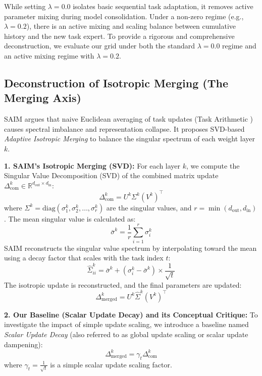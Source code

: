 While setting $\lambda = 0.0$ isolates basic sequential task adaptation, it removes active parameter mixing during model consolidation. Under a non-zero regime (e.g., $\lambda = 0.2$), there is an active mixing and scaling balance between cumulative history and the new task expert. To provide a rigorous and comprehensive deconstruction, we evaluate our grid under both the standard $\lambda = 0.0$ regime and an active mixing regime with $\lambda = 0.2$.

\subsection{Deconstruction of Isotropic Merging (The Merging Axis)}
SAIM argues that naive Euclidean averaging of task updates (Task Arithmetic \cite{taskarithmetic}) causes spectral imbalance and representation collapse. It proposes SVD-based \emph{Adaptive Isotropic Merging} to balance the singular spectrum of each weight layer $k$.

\textbf{1. SAIM's Isotropic Merging (SVD):} For each layer $k$, we compute the Singular Value Decomposition (SVD) of the combined matrix update $\Delta^k_{\text{com}} \in \mathbb{R}^{d_{\text{out}} \times d_{\text{in}}}$:
\begin{equation}
  \Delta^k_{\text{com}} = U^k \Sigma^k (V^k)^\top
\end{equation}
where $\Sigma^k = \text{diag}(\sigma^k_1, \sigma^k_2, \dots, \sigma^k_r)$ are the singular values, and $r = \min(d_{\text{out}}, d_{\text{in}})$. The mean singular value is calculated as:
\begin{equation}
  \bar{\sigma}^k = \frac{1}{r} \sum_{i=1}^r \sigma^k_i
\end{equation}
SAIM reconstructs the singular value spectrum by interpolating toward the mean using a decay factor that scales with the task index $t$:
\begin{equation}
  \hat{\Sigma}^k_{ii} = \bar{\sigma}^k + (\sigma^k_i - \bar{\sigma}^k) \times \frac{1}{\sqrt{t}}
\end{equation}
The isotropic update is reconstructed, and the final parameters are updated:
\begin{equation}
  \Delta^k_{\text{merged}} = U^k \hat{\Sigma}^k (V^k)^\top
\end{equation}

\textbf{2. Our Baseline (Scalar Update Decay) and its Conceptual Critique:} To investigate the impact of simple update scaling, we introduce a baseline named \emph{Scalar Update Decay} (also referred to as global update scaling or scalar update dampening):
\begin{equation}
  \Delta^k_{\text{merged}} = \gamma_t \Delta^k_{\text{com}}
\end{equation}
where $\gamma_t = \frac{1}{\sqrt{t}}$ is a simple scalar update scaling factor.

